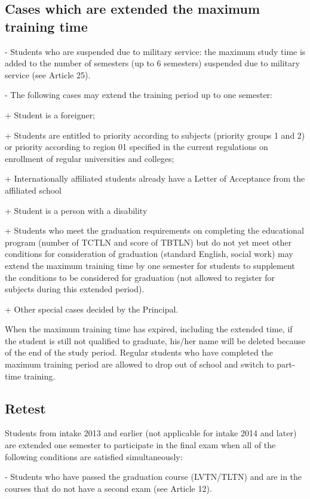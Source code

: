 \subsection{Cases which are extended the maximum training time}
- Students who are suspended due to military service: the maximum study time is added to the number of semesters (up to 6 semesters) suspended due to military service (see Article 25).

- The following cases may extend the training period up to one semester:

+ Student is a foreigner;

+ Students are entitled to priority according to subjects (priority groups 1 and 2) or priority according to region 01 specified in the current regulations on enrollment of regular universities and colleges;

+ Internationally affiliated students already have a Letter of Acceptance from the affiliated school

+ Student is a person with a disability

+ Students who meet the graduation requirements on completing the educational program (number of TCTLN and score of TBTLN) but do not yet meet other conditions for consideration of graduation (standard English, social work) may extend the maximum training time by one semester for students to supplement the conditions to be considered for graduation (not allowed to register for subjects during this extended period).

+ Other special cases decided by the Principal.

When the maximum training time has expired, including the extended time, if the student is still not qualified to graduate, his/her name will be deleted because of the end of the study period. Regular students who have completed the maximum training period are allowed to drop out of school and switch to part-time training.

\subsection{Retest}
Students from intake 2013 and earlier (not applicable for intake 2014 and later) are extended one semester to participate in the final exam when all of the following conditions are satisfied simultaneously:

- Students who have passed the graduation course (LVTN/TLTN) and are in the courses that do not have a second exam (see Article 12).

